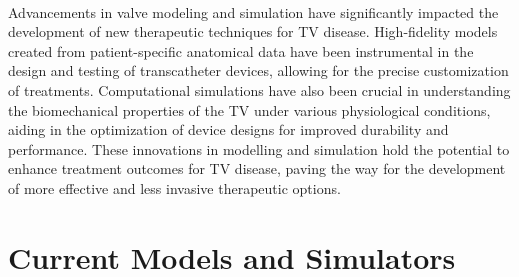 \\
Advancements in valve modeling and simulation have significantly impacted the development of new therapeutic techniques for \gls{TV} disease. High-fidelity models created from patient-specific anatomical data have been instrumental in the design and testing of transcatheter devices, allowing for the precise customization of treatments. Computational simulations have also been crucial in understanding the biomechanical properties of the \gls{TV} under various physiological conditions, aiding in the optimization of device designs for improved durability and performance. These innovations in modelling and simulation hold the potential to enhance treatment outcomes for \gls{TV} disease, paving the way for the development of more effective and less invasive therapeutic options.

\section{Current Models and Simulators}


